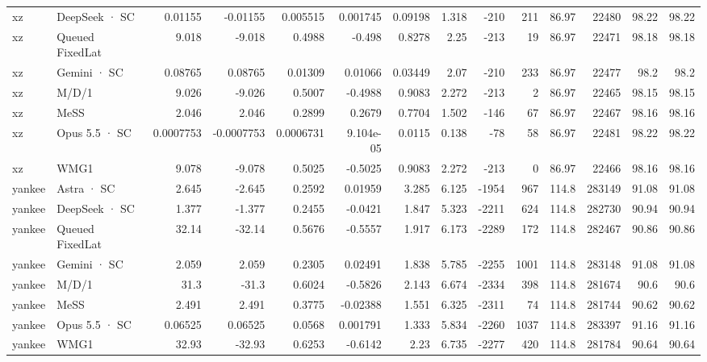 \begin{tabular}{llrrrrrrrrrrrr}
xz & DeepSeek · SC & 0.01155 & -0.01155 & 0.005515 & 0.001745 & 0.09198 & 1.318 & -210 & 211 & 86.97 & 22480 & 98.22 & 98.22 \\
xz & Queued FixedLat & 9.018 & -9.018 & 0.4988 & -0.498 & 0.8278 & 2.25 & -213 & 19 & 86.97 & 22471 & 98.18 & 98.18 \\
xz & Gemini · SC & 0.08765 & 0.08765 & 0.01309 & 0.01066 & 0.03449 & 2.07 & -210 & 233 & 86.97 & 22477 & 98.2 & 98.2 \\
xz & M/D/1 & 9.026 & -9.026 & 0.5007 & -0.4988 & 0.9083 & 2.272 & -213 & 2 & 86.97 & 22465 & 98.15 & 98.15 \\
xz & MeSS & 2.046 & 2.046 & 0.2899 & 0.2679 & 0.7704 & 1.502 & -146 & 67 & 86.97 & 22467 & 98.16 & 98.16 \\
xz & Opus 5.5 · SC & 0.0007753 & -0.0007753 & 0.0006731 & 9.104e-05 & 0.0115 & 0.138 & -78 & 58 & 86.97 & 22481 & 98.22 & 98.22 \\
xz & WMG1 & 9.078 & -9.078 & 0.5025 & -0.5025 & 0.9083 & 2.272 & -213 & 0 & 86.97 & 22466 & 98.16 & 98.16 \\
yankee & Astra · SC & 2.645 & -2.645 & 0.2592 & 0.01959 & 3.285 & 6.125 & -1954 & 967 & 114.8 & 283149 & 91.08 & 91.08 \\
yankee & DeepSeek · SC & 1.377 & -1.377 & 0.2455 & -0.0421 & 1.847 & 5.323 & -2211 & 624 & 114.8 & 282730 & 90.94 & 90.94 \\
yankee & Queued FixedLat & 32.14 & -32.14 & 0.5676 & -0.5557 & 1.917 & 6.173 & -2289 & 172 & 114.8 & 282467 & 90.86 & 90.86 \\
yankee & Gemini · SC & 2.059 & 2.059 & 0.2305 & 0.02491 & 1.838 & 5.785 & -2255 & 1001 & 114.8 & 283148 & 91.08 & 91.08 \\
yankee & M/D/1 & 31.3 & -31.3 & 0.6024 & -0.5826 & 2.143 & 6.674 & -2334 & 398 & 114.8 & 281674 & 90.6 & 90.6 \\
yankee & MeSS & 2.491 & 2.491 & 0.3775 & -0.02388 & 1.551 & 6.325 & -2311 & 74 & 114.8 & 281744 & 90.62 & 90.62 \\
yankee & Opus 5.5 · SC & 0.06525 & 0.06525 & 0.0568 & 0.001791 & 1.333 & 5.834 & -2260 & 1037 & 114.8 & 283397 & 91.16 & 91.16 \\
yankee & WMG1 & 32.93 & -32.93 & 0.6253 & -0.6142 & 2.23 & 6.735 & -2277 & 420 & 114.8 & 281784 & 90.64 & 90.64 \\
\bottomrule
\end{tabular}
